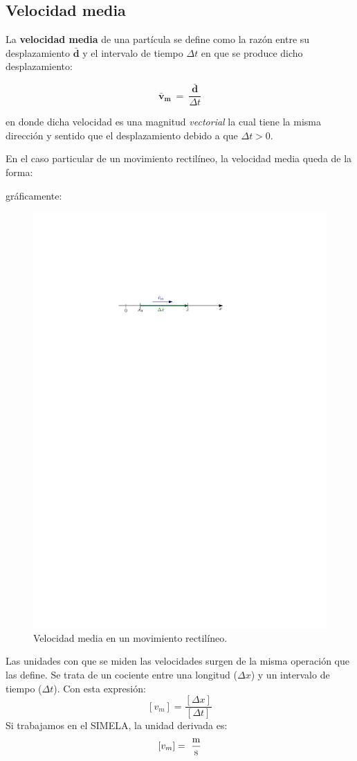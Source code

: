 \subsection{Velocidad media}

La \textbf{velocidad media }de una partícula se define como la razón entre su desplazamiento {$\mathbold{\bar{d}}$} y el intervalo de tiempo $\Delta t$ en que se produce dicho desplazamiento:

$$\mathbold{\bar{v}_m}\ = \ \frac{\mathbold{\bar{d}}}{\Delta t}$$

en donde dicha velocidad es una magnitud {\it vectorial} la cual tiene la misma dirección y sentido que el desplazamiento debido a que $\Delta t > 0$.


En el caso particular de un movimiento rectilíneo, la velocidad media queda de la forma:

\begin{center}
\end{center}

gráficamente:

\begin{figure}[h!]
\center
 \includegraphics[width=.5\textwidth]{img/vm.pdf}
  \caption{Velocidad media en un movimiento rectilíneo.}
\end{figure}


Las unidades con que se miden las velocidades surgen de la misma operación que las define. Se trata de un cociente entre una longitud ($\Delta x$) y un intervalo de tiempo ($\Delta t$). Con esta expresión: $$[v_m] = \frac{[\Delta x]}{[\Delta t]}$$
Si trabajamos en el SIMELA, la unidad derivada es:$$[v_m] = \ \frac{\mbox{m}}{\mbox{s}}$$

